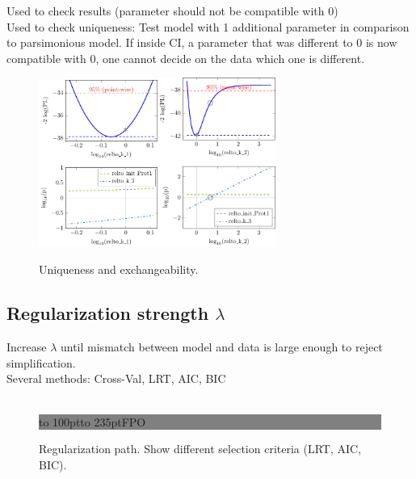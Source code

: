 \documentclass{bioinfo}
\begin{document}
Used to check results (parameter should not be compatible with 0)\\
Used to check uniqueness: Test model with 1 additional parameter in comparison to parsimonious model.
If inside CI, a parameter that was different to 0 is now compatible with 0, one cannot decide on the data which one is different.

\begin{figure}[!tpb]%
\centerline{\includegraphics[width=110pt]{Figures/relto_k_1.pdf}\includegraphics[width=110pt]{Figures/relto_k_2.pdf}}
\caption{Uniqueness and exchangeability.}\label{fig:01}
\end{figure}

\subsection{Regularization strength $\lambda$}
Increase $\lambda$ until mismatch between model and data is large enough to reject simplification.\\
Several methods: Cross-Val, LRT, AIC, BIC \\ \\

\begin{figure}[!tpb]%
\fboxsep=0pt\colorbox{gray}{\begin{minipage}[t]{235pt} \vbox to 100pt{\vfill\hbox to
235pt{\hfill\fontsize{24pt}{24pt}\selectfont FPO\hfill}\vfill}
\end{minipage}}
\caption{Regularization path. Show different selection criteria (LRT, AIC, BIC).}\label{fig:01}
\end{figure}
\end{document}
